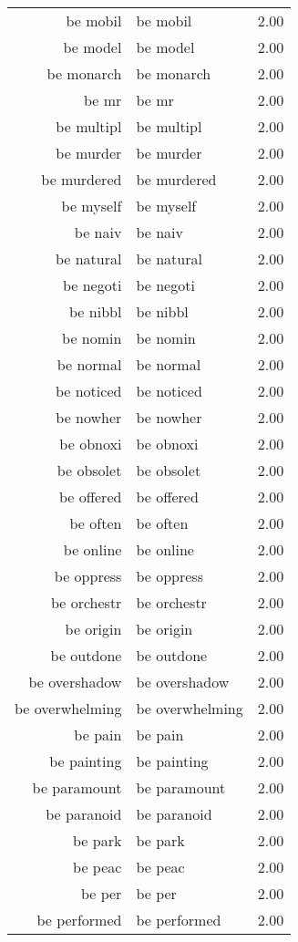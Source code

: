 \begin{table}[ht]
\begin{tabular}{rlr}
  be mobil & be mobil & 2.00 \\ 
  be model & be model & 2.00 \\ 
  be monarch & be monarch & 2.00 \\ 
  be mr & be mr & 2.00 \\ 
  be multipl & be multipl & 2.00 \\ 
  be murder & be murder & 2.00 \\ 
  be murdered & be murdered & 2.00 \\ 
  be myself & be myself & 2.00 \\ 
  be naiv & be naiv & 2.00 \\ 
  be natural & be natural & 2.00 \\ 
  be negoti & be negoti & 2.00 \\ 
  be nibbl & be nibbl & 2.00 \\ 
  be nomin & be nomin & 2.00 \\ 
  be normal & be normal & 2.00 \\ 
  be noticed & be noticed & 2.00 \\ 
  be nowher & be nowher & 2.00 \\ 
  be obnoxi & be obnoxi & 2.00 \\ 
  be obsolet & be obsolet & 2.00 \\ 
  be offered & be offered & 2.00 \\ 
  be often & be often & 2.00 \\ 
  be online & be online & 2.00 \\ 
  be oppress & be oppress & 2.00 \\ 
  be orchestr & be orchestr & 2.00 \\ 
  be origin & be origin & 2.00 \\ 
  be outdone & be outdone & 2.00 \\ 
  be overshadow & be overshadow & 2.00 \\ 
  be overwhelming & be overwhelming & 2.00 \\ 
  be pain & be pain & 2.00 \\ 
  be painting & be painting & 2.00 \\ 
  be paramount & be paramount & 2.00 \\ 
  be paranoid & be paranoid & 2.00 \\ 
  be park & be park & 2.00 \\ 
  be peac & be peac & 2.00 \\ 
  be per & be per & 2.00 \\ 
  be performed & be performed & 2.00 \\ 

\end{tabular}
\end{table}
